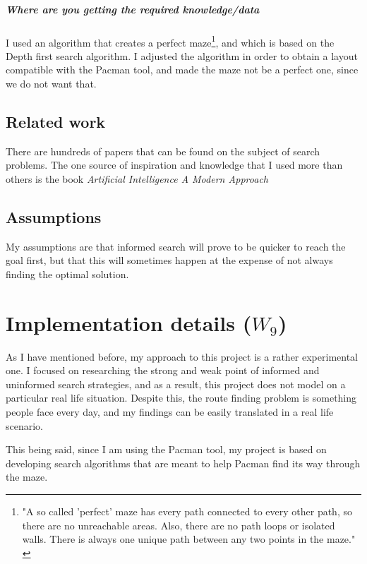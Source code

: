\documentclass[a4paper,12pt]{report}
\begin{document}
\paragraph{Where are you getting the required knowledge/data}
I used an algorithm\cite{wiki:02} that creates a perfect maze\footnote{"A so called 'perfect' maze has every path connected to every other path, so there are no unreachable areas. Also, there are no path loops or isolated walls. There is always one unique path between any two points in the maze." \cite{wiki:03}}, and which is based on the Depth first search algorithm. I adjusted the algorithm in order to obtain a layout compatible with the Pacman tool, and made the maze not be a perfect one, since we do not want that.


\section{Related work}
There are hundreds of papers that can be found on the subject of search problems. The one source of inspiration and knowledge that I used more than others is the book \textit{Artificial Intelligence A Modern Approach}\cite{russell2016artificial}

\section{Assumptions}
My assumptions are that informed search will prove to be quicker to reach the goal first, but that this will sometimes happen at the expense of not always finding the optimal solution. 



\chapter{Implementation details ($W_9$)}


As I have mentioned before, my approach to this project is a rather experimental one. I focused on researching the strong and weak point of informed and uninformed search strategies, and as a result, this project does not model on a particular real life situation. Despite this, the route finding problem is something people face every day, and my findings can be easily translated in a real life scenario.

This being said, since I am using the Pacman tool, my project is based on developing search algorithms that are meant to help Pacman find its way through the maze.
\end{document}

